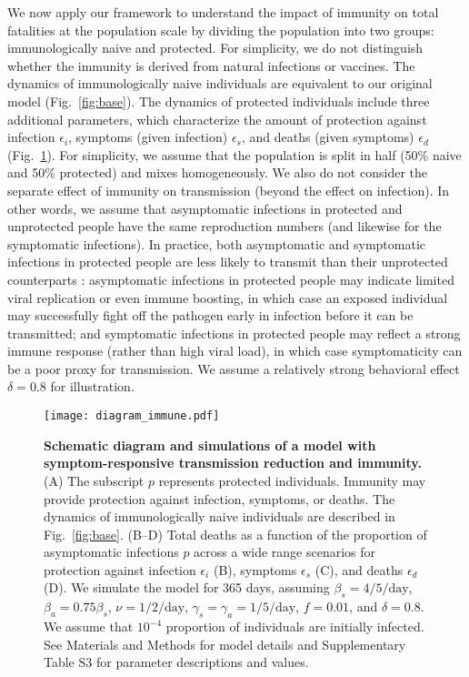 \documentclass[12pt]{article}
\newcommand{\fref}[1]{Fig.~\ref{fig:#1}}
\begin{document}
We now apply our framework to understand the impact of immunity on total fatalities at the population scale by dividing the population into two groups: immunologically naive and protected.
For simplicity, we do not distinguish whether the immunity is derived from natural infections or vaccines.
The dynamics of immunologically naive individuals are equivalent to our original model (\fref{base}).
The dynamics of protected individuals include three additional parameters, which characterize the amount of protection against infection $\epsilon_i$, symptoms (given infection) $\epsilon_s$, and deaths (given symptoms) $\epsilon_d$ (\fref{immune}).
For simplicity, we assume that the population is split in half (50\% naive and 50\% protected) and mixes homogeneously. We also do not consider the separate effect of immunity on transmission (beyond the effect on infection). 
In other words, we assume that asymptomatic infections in protected and unprotected people have the same reproduction numbers (and likewise for the symptomatic infections).
In practice, both asymptomatic and symptomatic infections in protected people are less likely to transmit than their unprotected counterparts \citep{lipsitch2020understanding}: asymptomatic infections in protected people may indicate limited viral replication or even immune boosting, in which case an exposed individual may successfully fight off the pathogen early in infection before it can be transmitted; and symptomatic infections in protected people may reflect a strong immune response (rather than high viral load), in which case symptomaticity can be a poor proxy for transmission.
We assume a relatively strong behavioral effect $\delta=0.8$ for illustration.

\begin{figure}[!ht]
\texttt{[image: diagram\_immune.pdf]}
\caption{
\textbf{Schematic diagram and simulations of a model with symptom-responsive transmission reduction and immunity.}
(A) The subscript $p$ represents protected individuals. 
Immunity may provide protection against infection, symptoms, or deaths.
The dynamics of immunologically naive individuals are described in \fref{base}.
(B--D) Total deaths as a function of the proportion of asymptomatic infections $p$ across a wide range scenarios for protection against infection $\epsilon_i$ (B), symptoms $\epsilon_s$ (C), and deaths $\epsilon_d$ (D).
We simulate the model for 365 days, assuming $\beta_s = 4/5/\mathrm{day}$, $\beta_a = 0.75 \beta_s$, $\nu=1/2/\mathrm{day}$, $\gamma_s=\gamma_a=1/5/\mathrm{day}$, $f=0.01$, and $\delta=0.8$.
We assume that $10^{-4}$ proportion of individuals are initially infected.
See Materials and Methods for model details and Supplementary Table S3 for parameter descriptions and values.
}
\label{fig:immune}
\end{figure}
\end{document}
